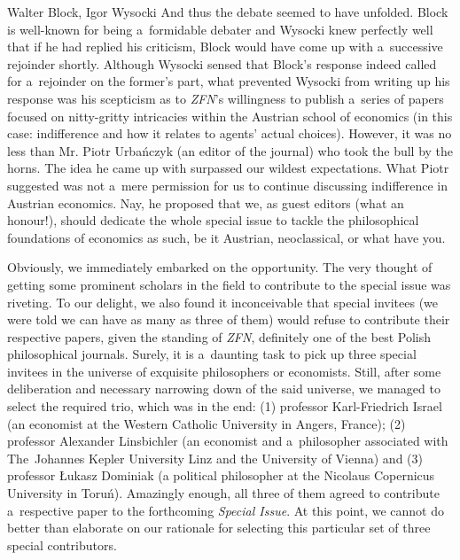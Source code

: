 \begin{editorialeng2auth}{Walter Block, Igor Wysocki}
And thus the debate seemed to have unfolded. Block is well-known for being a~formidable debater and Wysocki knew perfectly well that if he had replied his criticism, Block would have come up with a~successive rejoinder shortly. Although Wysocki sensed that Block's response indeed called for a~rejoinder on the former's part, what prevented Wysocki from writing up his response was his scepticism as to \textit{ZFN}'s willingness to publish a~series of papers focused on nitty-gritty intricacies within the Austrian school of economics (in this case: indifference and how it relates to agents' actual choices). However, it was no less than Mr. Piotr Urbańczyk (an editor of the journal) who took the bull by the horns. The idea he came up with surpassed our wildest expectations. What Piotr suggested was not a~mere permission for us to continue discussing indifference in Austrian economics. Nay, he proposed that we, as guest editors (what an honour!), should dedicate the whole special issue to tackle the philosophical foundations of economics as such, be it Austrian, neoclassical, or what have you.



Obviously, we immediately embarked on the opportunity. The very thought of getting some prominent scholars in the field to contribute to the special issue was riveting. To our delight, we also found it inconceivable that special invitees (we were told we can have as many as three of them) would refuse to contribute their respective papers, given the standing of \textit{ZFN}, definitely one of the best Polish philosophical journals. Surely, it is a~daunting task to pick up three special invitees in the universe of exquisite philosophers or economists. Still, after some deliberation and necessary narrowing down of the said universe, we managed to select the required trio, which was in the end: (1) professor Karl-Friedrich Israel (an economist at the Western Catholic University in Angers, France); (2) professor Alexander Linsbichler (an economist and a~philosopher associated with The~Johannes Kepler University Linz and the University of Vienna) and (3) professor Łukasz Dominiak (a political philosopher at the Nicolaus Copernicus University in Toruń). Amazingly enough, all three of them agreed to contribute a~respective paper to the forthcoming \textit{Special Issue}. At this point, we cannot do better than elaborate on our rationale for selecting this particular set of three special contributors.




\end{editorialeng2auth}
